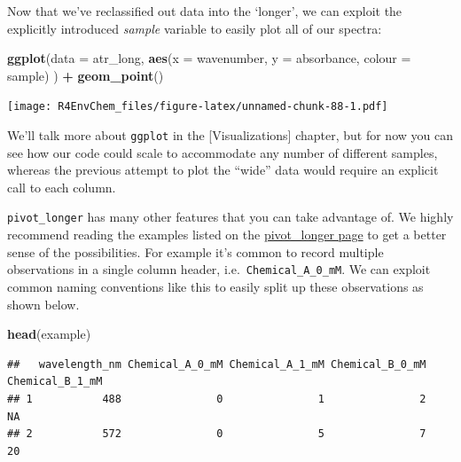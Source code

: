 \documentclass[
]{book}
\newenvironment{Shaded}{\begin{snugshade}}{\end{snugshade}}
\newcommand{\AttributeTok}[1]{\textcolor[rgb]{0.13,0.29,0.53}{#1}}
\newcommand{\FunctionTok}[1]{\textcolor[rgb]{0.13,0.29,0.53}{\textbf{#1}}}
\newcommand{\NormalTok}[1]{#1}
\newcommand{\SpecialCharTok}[1]{\textcolor[rgb]{0.81,0.36,0.00}{\textbf{#1}}}
\begin{document}
Now that we've reclassified out data into the `longer', we can exploit the explicitly introduced \emph{sample} variable to easily plot all of our spectra:

\begin{Shaded}
\begin{Highlighting}[]
\FunctionTok{ggplot}\NormalTok{(}\AttributeTok{data =}\NormalTok{ atr\_long, }
       \FunctionTok{aes}\NormalTok{(}\AttributeTok{x =}\NormalTok{ wavenumber, }
           \AttributeTok{y =}\NormalTok{ absorbance, }
           \AttributeTok{colour =}\NormalTok{ sample)}
\NormalTok{       ) }\SpecialCharTok{+}
  \FunctionTok{geom\_point}\NormalTok{()}
\end{Highlighting}
\end{Shaded}

\texttt{[image: R4EnvChem\_files/figure-latex/unnamed-chunk-88-1.pdf]}

We'll talk more about \texttt{ggplot} in the {[}Visualizations{]} chapter, but for now you can see how our code could scale to accommodate any number of different samples, whereas the previous attempt to plot the ``wide'' data would require an explicit call to each column.

\texttt{pivot\_longer} has many other features that you can take advantage of. We highly recommend reading the examples listed on the \href{https://tidyr.tidyverse.org/reference/pivot_longer.html}{pivot\_longer page} to get a better sense of the possibilities. For example it's common to record multiple observations in a single column header, i.e.~\texttt{Chemical\_A\_0\_mM}. We can exploit common naming conventions like this to easily split up these observations as shown below.

\begin{Shaded}
\begin{Highlighting}[]
\FunctionTok{head}\NormalTok{(example)}
\end{Highlighting}
\end{Shaded}

\begin{verbatim}
##   wavelength_nm Chemical_A_0_mM Chemical_A_1_mM Chemical_B_0_mM Chemical_B_1_mM
## 1           488               0               1               2              NA
## 2           572               0               5               7              20
\end{verbatim}
\end{document}
